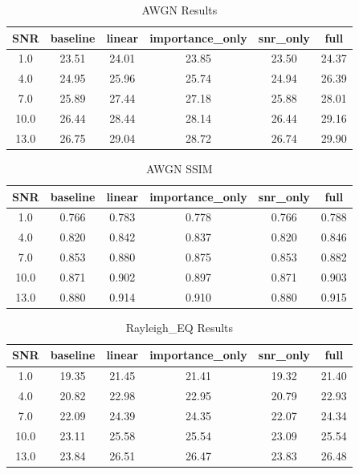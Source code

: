 \begin{table}[h]
\centering
\caption{AWGN Results}
\begin{tabular}{c|ccccc}
\hline
SNR & baseline & linear & importance_only & snr_only & full \\ \hline
1.0 & 23.51 & 24.01 & 23.85 & 23.50 & 24.37 \\
4.0 & 24.95 & 25.96 & 25.74 & 24.94 & 26.39 \\
7.0 & 25.89 & 27.44 & 27.18 & 25.88 & 28.01 \\
10.0 & 26.44 & 28.44 & 28.14 & 26.44 & 29.16 \\
13.0 & 26.75 & 29.04 & 28.72 & 26.74 & 29.90 \\
\hline
\end{tabular}
\end{table}

\begin{table}[h]
\centering
\caption{AWGN SSIM}
\begin{tabular}{c|ccccc}
\hline
SNR & baseline & linear & importance_only & snr_only & full \\ \hline
1.0 & 0.766 & 0.783 & 0.778 & 0.766 & 0.788 \\
4.0 & 0.820 & 0.842 & 0.837 & 0.820 & 0.846 \\
7.0 & 0.853 & 0.880 & 0.875 & 0.853 & 0.882 \\
10.0 & 0.871 & 0.902 & 0.897 & 0.871 & 0.903 \\
13.0 & 0.880 & 0.914 & 0.910 & 0.880 & 0.915 \\
\hline
\end{tabular}
\end{table}
\begin{table}[h]
\centering
\caption{Rayleigh_EQ Results}
\begin{tabular}{c|ccccc}
\hline
SNR & baseline & linear & importance_only & snr_only & full \\ \hline
1.0 & 19.35 & 21.45 & 21.41 & 19.32 & 21.40 \\
4.0 & 20.82 & 22.98 & 22.95 & 20.79 & 22.93 \\
7.0 & 22.09 & 24.39 & 24.35 & 22.07 & 24.34 \\
10.0 & 23.11 & 25.58 & 25.54 & 23.09 & 25.54 \\
13.0 & 23.84 & 26.51 & 26.47 & 23.83 & 26.48 \\
\hline
\end{tabular}
\end{table}

